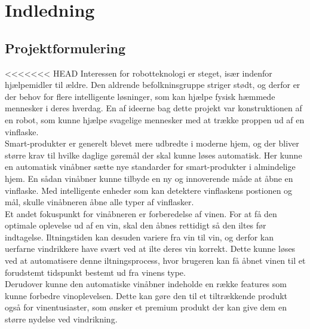 \chapter{Indledning}
\section{Projektformulering}
<<<<<<< HEAD
Interessen for robotteknologi er steget, især indenfor hjælpemidler til ældre. Den aldrende befolkninsgruppe striger stødt, og derfor er der behov for flere 
intelligente løsninger, som kan hjælpe fysisk hæmmede mennesker i deres hverdag. En af ideerne bag dette projekt var konstruktionen af en robot, som kunne hjælpe 
svagelige mennesker med at trække proppen ud af en vinflaske.\\

Smart-produkter er generelt blevet mere udbredte i moderne hjem, og der bliver større krav til hvilke daglige gøremål der skal kunne løses automatisk. Her kunne 
en automatisk vinåbner sætte nye standarder for smart-produkter i almindelige hjem. En sådan vinåbner kunne tilbyde en ny og innoverende måde at åbne en 
vinflaske. Med intelligente enheder som kan detektere vinflaskens postionen og mål, skulle vinåbneren åbne alle typer af vinflasker. \\

Et andet fokuspunkt for vinåbneren er forberedelse af vinen. For at få den optimale oplevelse ud af en vin, skal den åbnes rettidigt så den iltes før indtagelse.
Iltningstiden kan desuden variere fra vin til vin, og derfor kan uerfarne vindrikkere have svært ved at ilte deres vin korrekt. Dette kunne løses ved at 
automatisere denne iltningsprocess, hvor brugeren kan få åbnet vinen til et forudstemt tidspunkt bestemt ud fra vinens type.\\

Derudover kunne den automatiske vinåbner indeholde en række features som kunne forbedre vinoplevelsen. Dette kan gøre den til et tiltrækkende produkt også for 
vinentusiaster, som ønsker et premium produkt der kan give dem en større nydelse ved vindrikning.\\


